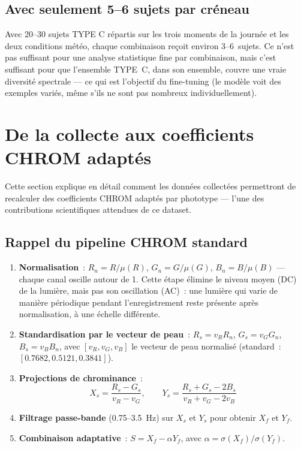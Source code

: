 \documentclass[11pt,a4paper]{article}
\begin{document}
\subsection{Avec seulement 5--6 sujets par cr\'eneau}

Avec 20--30 sujets TYPE C r\'epartis sur les trois moments de la journ\'ee et
les deux conditions m\'et\'eo, chaque combinaison re\c{c}oit environ
3--6~sujets. Ce n'est pas suffisant pour une analyse statistique fine par
combinaison, mais c'est suffisant pour que l'ensemble TYPE~C, dans son
ensemble, couvre une vraie diversit\'e spectrale --- ce qui est l'objectif
du fine-tuning (le mod\`ele voit des exemples vari\'es, m\^eme s'ils ne sont
pas nombreux individuellement).

\newpage
\section{De la collecte aux coefficients CHROM adapt\'es}

Cette section explique en d\'etail comment les donn\'ees collect\'ees
permettront de recalculer des coefficients CHROM adapt\'es par phototype ---
l'une des contributions scientifiques attendues de ce dataset.

\subsection{Rappel du pipeline CHROM standard}

\begin{enumerate}
\item \textbf{Normalisation}~: $R_n = R/\mu(R)$, $G_n = G/\mu(G)$,
$B_n = B/\mu(B)$ --- chaque canal oscille autour de 1. Cette \'etape
\'elimine le niveau moyen (DC) de la lumi\`ere, mais pas son oscillation
(AC)~: une lumi\`ere qui varie de mani\`ere p\'eriodique pendant
l'enregistrement reste pr\'esente apr\`es normalisation, \`a une \'echelle
diff\'erente.
\item \textbf{Standardisation par le vecteur de peau}~: $R_s = v_R R_n$,
$G_s = v_G G_n$, $B_s = v_B B_n$, avec $[v_R, v_G, v_B]$ le vecteur de peau
normalis\'e (standard~: $[0.7682, 0.5121, 0.3841]$).
\item \textbf{Projections de chrominance}~:
\[
X_s = \frac{R_s - G_s}{v_R - v_G}, \qquad
Y_s = \frac{R_s + G_s - 2B_s}{v_R + v_G - 2v_B}
\]
\item \textbf{Filtrage passe-bande} (0.75--3.5~Hz) sur $X_s$ et $Y_s$ pour
obtenir $X_f$ et $Y_f$.
\item \textbf{Combinaison adaptative}~: $S = X_f - \alpha Y_f$, avec
$\alpha = \sigma(X_f)/\sigma(Y_f)$.
\end{enumerate}
\end{document}
